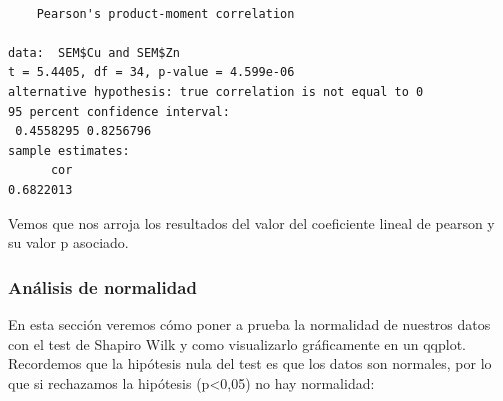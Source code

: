 \documentclass[
  letterpaper,
  DIV=11,
  numbers=noendperiod]{scrartcl}
\newenvironment{Shaded}{\begin{snugshade}}{\end{snugshade}}
\newcommand{\AttributeTok}[1]{\textcolor[rgb]{0.40,0.45,0.13}{#1}}
\newcommand{\CommentTok}[1]{\textcolor[rgb]{0.37,0.37,0.37}{#1}}
\newcommand{\DecValTok}[1]{\textcolor[rgb]{0.68,0.00,0.00}{#1}}
\newcommand{\FunctionTok}[1]{\textcolor[rgb]{0.28,0.35,0.67}{#1}}
\newcommand{\NormalTok}[1]{\textcolor[rgb]{0.00,0.23,0.31}{#1}}
\newcommand{\SpecialCharTok}[1]{\textcolor[rgb]{0.37,0.37,0.37}{#1}}
\newcommand{\StringTok}[1]{\textcolor[rgb]{0.13,0.47,0.30}{#1}}
\begin{document}
\begin{verbatim}

    Pearson's product-moment correlation

data:  SEM$Cu and SEM$Zn
t = 5.4405, df = 34, p-value = 4.599e-06
alternative hypothesis: true correlation is not equal to 0
95 percent confidence interval:
 0.4558295 0.8256796
sample estimates:
      cor 
0.6822013 
\end{verbatim}

Vemos que nos arroja los resultados del valor del coeficiente lineal de
pearson y su valor p asociado.

\hypertarget{anuxe1lisis-de-normalidad}{%
\subsubsection{Análisis de normalidad}\label{anuxe1lisis-de-normalidad}}

En esta sección veremos cómo poner a prueba la normalidad de nuestros
datos con el test de Shapiro Wilk y como visualizarlo gráficamente en un
qqplot. Recordemos que la hipótesis nula del test es que los datos son
normales, por lo que si rechazamos la hipótesis (p\textless0,05) no hay
normalidad:

\begin{Shaded}
\end{Shaded}
\end{document}
